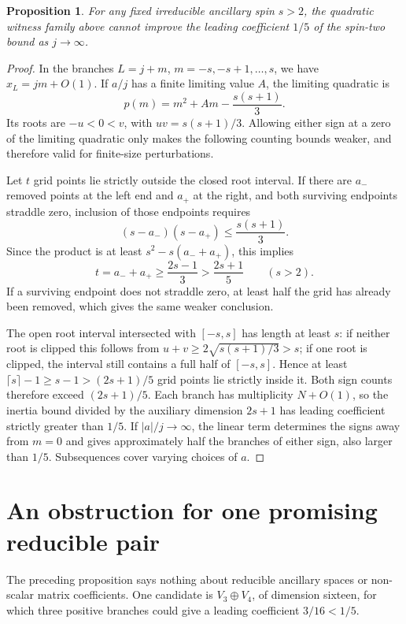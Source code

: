 \documentclass[11pt]{article}
\newtheorem{proposition}{Proposition}
\begin{document}
\begin{proposition}
For any fixed irreducible ancillary spin $s>2$, the quadratic witness
family above cannot improve the leading coefficient $1/5$ of the
spin-two bound as $j\to\infty$.
\end{proposition}
\begin{proof}
In the branches $L=j+m$, $m=-s,-s+1,\ldots,s$, we have
$x_L=jm+O(1)$. If $a/j$ has a finite limiting value $A$, the limiting
quadratic is
\[
 p(m)=m^2+Am-\frac{s(s+1)}3.
\]
Its roots are $-u<0<v$, with $uv=s(s+1)/3$. Allowing either sign at a
zero of the limiting quadratic only makes the following counting bounds
weaker, and therefore valid for finite-size perturbations.

Let $t$ grid points lie strictly outside the closed root interval. If
there are $a_-$ removed points at the left end and $a_+$ at the right,
and both surviving endpoints straddle zero, inclusion of those endpoints
requires
\[
 (s-a_-)(s-a_+)\le\frac{s(s+1)}3.
\]
Since the product is at least $s^2-s(a_-+a_+)$, this implies
\[
 t=a_-+a_+\ge\frac{2s-1}{3}>\frac{2s+1}{5}\qquad(s>2).
\]
If a surviving endpoint does not straddle zero, at least half the grid
has already been removed, which gives the same weaker conclusion.

The open root interval intersected with $[-s,s]$ has length at least
$s$: if neither root is clipped this follows from
$u+v\ge2\sqrt{s(s+1)/3}>s$; if one root is clipped, the interval still
contains a full half of $[-s,s]$. Hence at least
$\lceil s\rceil-1\ge s-1>(2s+1)/5$ grid points lie strictly inside it.
Both sign counts therefore exceed $(2s+1)/5$. Each branch has
multiplicity $N+O(1)$, so the inertia bound divided by the auxiliary
dimension $2s+1$ has leading coefficient strictly greater than $1/5$.
If $|a|/j\to\infty$, the linear term determines the signs away from
$m=0$ and gives approximately half the branches of either sign, also
larger than $1/5$. Subsequences cover varying choices of $a$.
\end{proof}

\section*{An obstruction for one promising reducible pair}
The preceding proposition says nothing about reducible ancillary spaces
or non-scalar matrix coefficients. One candidate is $V_3\oplus V_4$, of
dimension sixteen, for which three positive branches could give a
leading coefficient $3/16<1/5$.
\end{document}
